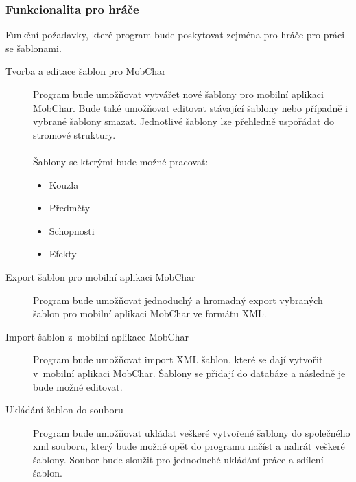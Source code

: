 \documentclass[thesis=B,czech]{resources/FITthesis}[2012/06/26]
\begin{document}
\subsubsection{Funkcionalita pro hráče}
Funkční požadavky, které program bude poskytovat zejména pro hráče pro práci se šablonami.
\begin{description}

\item[Tvorba a editace šablon pro MobChar] Program bude umožňovat vytvářet nové šablony pro mobilní aplikaci MobChar. Bude také umožňovat editovat stávající šablony nebo případně i vybrané šablony smazat. Jednotlivé šablony lze přehledně uspořádat do stromové struktury.\\
\\
Šablony se kterými bude možné pracovat:
				\begin{itemize}
					\item Kouzla
					\item Předměty
					\item Schopnosti
					\item Efekty
				\end{itemize}		
\item[Export šablon pro mobilní aplikaci MobChar] Program bude umožňovat jednoduchý a hromadný export vybraných šablon pro mobilní aplikaci MobChar ve formátu XML.

\item[Import šablon z~mobilní aplikace MobChar] Program bude umožňovat import XML šablon, které se dají vytvořit v~mobilní aplikaci MobChar. Šablony se přidají do databáze a následně je bude možné editovat.

\item[Ukládání šablon do souboru] Program bude umožňovat ukládat veškeré vytvořené šablony do společného xml souboru, který bude možné opět do programu načíst a nahrát veškeré šablony. Soubor bude sloužit pro jednoduché ukládání práce a sdílení šablon.
\end{description}
\end{document}
